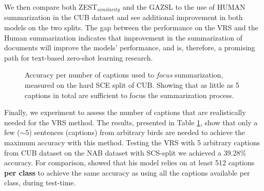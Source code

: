 \documentclass[11pt,a4paper]{article}
\newcommand\yuval[1]{\textcolor{darkpink}{\textbf{YUVAL:} #1 }}
\newcommand\reut[1]{\textcolor{green}{\textbf{REUT:} #1 }}
\begin{document}
 
We then compare both ZEST$_{similarity}$ and the GAZSL to the use of HUMAN summarization in the CUB dataset and see additional improvement in both models on the two splits. The gap between the performance on the VRS and the Human summarization indicates that improvement in the summarization of documents will improve the models' performance, and is, therefore, a promising path for text-based zero-shot learning research.


\begin{figure}[t]
\centering
{}
 \caption{Accuracy per number of captions used to \textit{focus}  summarization, measured on the hard SCE split of CUB. Showing that as little as 5 captions in total are sufficient to focus the summarization process.
 }
\label{fig:captions}
\end{figure}


Finally, we experiment to assess the number of captions that are realistically needed for the VRS method. The results, presented in Table \ref{fig:captions}, show that only a few ($\sim5$) 
 sentences (captions) from arbitrary birds are needed to achieve the maximum accuracy with this method.
Testing the VRS with 5 arbitrary captions from CUB dataset on the NAB dataset with SCS-split we achieved a 39.28\% accuracy. %
For comparison, \citet{reed2016learning} showed that his model relies on at least 512 captions \textbf{per class} to achieve the same accuracy as using all the captions available per class, during test-time.


\end{document}
